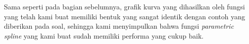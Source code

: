 \documentclass[journal,12pt,onecolumn,a4paper]{IEEEtran}
\begin{document}
\pagebreak
{}
Sama seperti pada bagian sebelumnya, grafik kurva yang dihasilkan oleh fungsi yang telah kami buat memiliki bentuk yang sangat identik dengan contoh yang diberikan pada soal, sehingga kami menyimpulkan bahwa fungsi \emph{parametric spline} yang kami buat sudah memiliki performa yang cukup baik.
\end{document}
